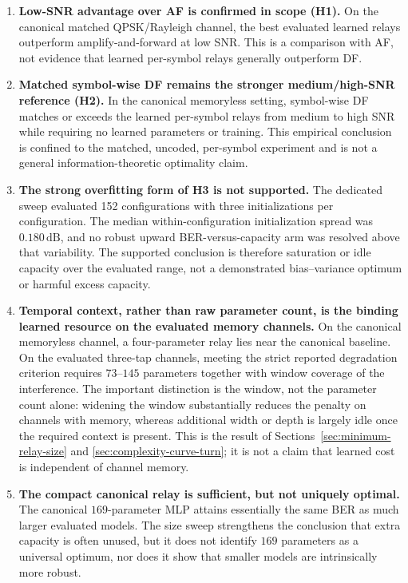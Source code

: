 \begin{enumerate}
    \item \textbf{Low-SNR advantage over AF is confirmed in scope (H1).}
    On the canonical matched QPSK/Rayleigh channel, the best evaluated
    learned relays outperform amplify-and-forward at low SNR.  This is a
    comparison with AF, not evidence that learned per-symbol relays generally
    outperform DF.

    \item \textbf{Matched symbol-wise DF remains the stronger medium/high-SNR
    reference (H2).}
    In the canonical memoryless setting, symbol-wise DF matches or exceeds
    the learned per-symbol relays from medium to high SNR while requiring no
    learned parameters or training.  This empirical conclusion is confined
    to the matched, uncoded, per-symbol experiment and is not a general
    information-theoretic optimality claim.

    \item \textbf{The strong overfitting form of H3 is not supported.}
    The dedicated sweep evaluated 152 configurations with three
    initializations per configuration.  The median within-configuration
    initialization spread was \(0.180\,\mathrm{dB}\), and no robust upward
    BER-versus-capacity arm was resolved above that variability.  The
    supported conclusion is therefore saturation or idle capacity over the
    evaluated range, not a demonstrated bias--variance optimum or harmful
    excess capacity.

    \item \textbf{Temporal context, rather than raw parameter count, is the
    binding learned resource on the evaluated memory channels.}
    On the canonical memoryless channel, a four-parameter relay lies near
    the canonical baseline.  On the evaluated three-tap channels, meeting
    the strict reported degradation criterion requires \(73\)--\(145\)
    parameters together with window coverage of the interference.  The
    important distinction is the window, not the parameter count alone:
    widening the window substantially reduces the penalty on channels with
    memory, whereas additional width or depth is largely idle once the
    required context is present.  This is the result of
    Sections~\ref{sec:minimum-relay-size} and
    \ref{sec:complexity-curve-turn}; it is not a claim that learned cost is
    independent of channel memory.

    \item \textbf{The compact canonical relay is sufficient, but not uniquely
    optimal.}
    The canonical \(169\)-parameter MLP attains essentially the same BER as
    much larger evaluated models.  The size sweep strengthens the conclusion
    that extra capacity is often unused, but it does not identify
    \(169\) parameters as a universal optimum, nor does it show that smaller
    models are intrinsically more robust.


\end{enumerate}
